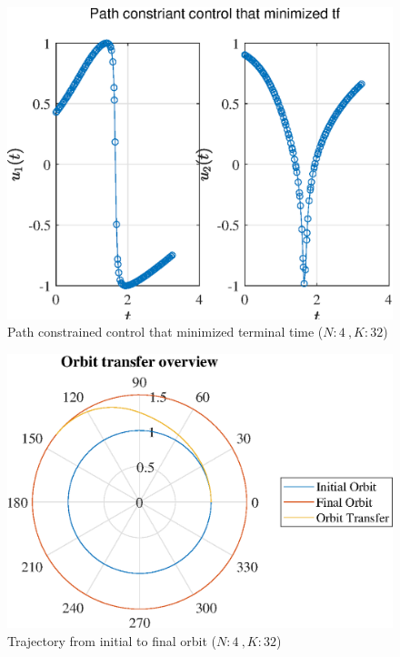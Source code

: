 \documentclass[]{article}
\begin{document}
	\begin{figure}
		\centering
		\includegraphics[scale=0.75]{path_N4_K32_C3_tf.eps}
		\caption{Path constrained control that minimized terminal time (\(N:4\ , K:32\))}
		\label{fig:path_N4_K32_C3_tf}
	\end{figure}
	\begin{figure}
		\centering
		\includegraphics[scale=0.75]{orbit_N4_K32_C3_tf.eps}
		\caption{Trajectory from initial to final orbit (\(N:4\ , K:32\))}
		\label{fig:orbit_N4_K32_C3_tf}
	\end{figure}
\end{document}
